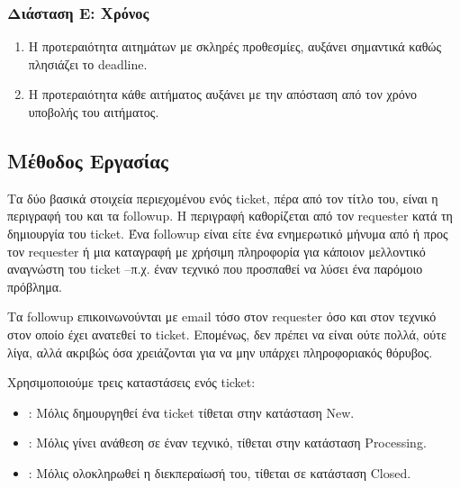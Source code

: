 \documentclass[letterpaper,10pt,greek]{sphinxhowto}
\begin{document}
\subsubsection{Διάσταση Ε: Χρόνος}
\label{\detokenize{PolicyTicket:id5}}\begin{enumerate}
%
\item {} 
\sphinxAtStartPar
Η προτεραιότητα αιτημάτων με σκληρές προθεσμίες, αυξάνει σημαντικά καθώς πλησιάζει το deadline.

\item {} 
\sphinxAtStartPar
Η προτεραιότητα κάθε αιτήματος αυξάνει με την απόσταση από τον χρόνο υποβολής του αιτήματος.

\end{enumerate}


\subsection{Μέθοδος Εργασίας}
\label{\detokenize{PolicyTicket:id6}}
\sphinxAtStartPar
Τα δύο βασικά στοιχεία περιεχομένου ενός ticket, πέρα από τον τίτλο του,
είναι η περιγραφή του και τα followup. Η περιγραφή καθορίζεται από τον
requester κατά τη δημιουργία του ticket. Ένα followup είναι είτε ένα
ενημερωτικό μήνυμα από ή προς τον requester ή μια καταγραφή με χρήσιμη
πληροφορία για κάποιον μελλοντικό αναγνώστη του ticket –π.χ. έναν
τεχνικό που προσπαθεί να λύσει ένα παρόμοιο πρόβλημα.

\sphinxAtStartPar
Τα followup επικοινωνούνται με email τόσο στον requester όσο και
στον τεχνικό στον οποίο έχει ανατεθεί το ticket. Επομένως, δεν
πρέπει να είναι ούτε πολλά, ούτε λίγα, αλλά ακριβώς όσα χρειάζονται
για να μην υπάρχει πληροφοριακός θόρυβος.

\sphinxAtStartPar
Χρησιμοποιούμε τρεις καταστάσεις ενός ticket:
\begin{itemize}
\item {} 
\sphinxAtStartPar
{}: Μόλις δημουργηθεί ένα ticket τίθεται στην κατάσταση New.

\item {} 
\sphinxAtStartPar
{}: Μόλις γίνει ανάθεση σε έναν τεχνικό, τίθεται στην κατάσταση Processing.

\item {} 
\sphinxAtStartPar
{}: Μόλις ολοκληρωθεί η διεκπεραίωσή του, τίθεται σε κατάσταση Closed.

\end{itemize}
\end{document}
